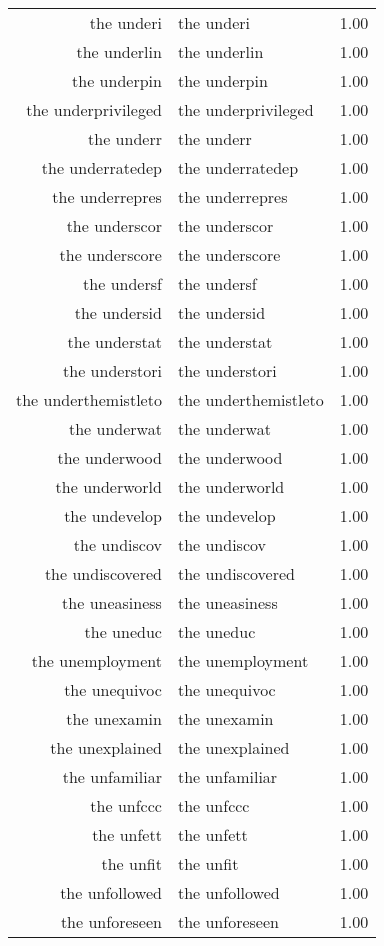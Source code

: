 \begin{table}[ht]
\begin{tabular}{rlr}
  the underi & the underi & 1.00 \\ 
  the underlin & the underlin & 1.00 \\ 
  the underpin & the underpin & 1.00 \\ 
  the underprivileged & the underprivileged & 1.00 \\ 
  the underr & the underr & 1.00 \\ 
  the underratedep & the underratedep & 1.00 \\ 
  the underrepres & the underrepres & 1.00 \\ 
  the underscor & the underscor & 1.00 \\ 
  the underscore & the underscore & 1.00 \\ 
  the undersf & the undersf & 1.00 \\ 
  the undersid & the undersid & 1.00 \\ 
  the understat & the understat & 1.00 \\ 
  the understori & the understori & 1.00 \\ 
  the underthemistleto & the underthemistleto & 1.00 \\ 
  the underwat & the underwat & 1.00 \\ 
  the underwood & the underwood & 1.00 \\ 
  the underworld & the underworld & 1.00 \\ 
  the undevelop & the undevelop & 1.00 \\ 
  the undiscov & the undiscov & 1.00 \\ 
  the undiscovered & the undiscovered & 1.00 \\ 
  the uneasiness & the uneasiness & 1.00 \\ 
  the uneduc & the uneduc & 1.00 \\ 
  the unemployment & the unemployment & 1.00 \\ 
  the unequivoc & the unequivoc & 1.00 \\ 
  the unexamin & the unexamin & 1.00 \\ 
  the unexplained & the unexplained & 1.00 \\ 
  the unfamiliar & the unfamiliar & 1.00 \\ 
  the unfccc & the unfccc & 1.00 \\ 
  the unfett & the unfett & 1.00 \\ 
  the unfit & the unfit & 1.00 \\ 
  the unfollowed & the unfollowed & 1.00 \\ 
  the unforeseen & the unforeseen & 1.00 \\ 

\end{tabular}
\end{table}

